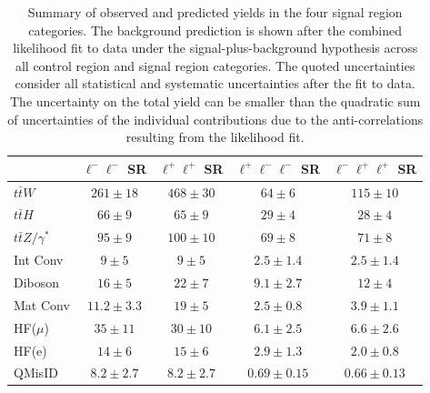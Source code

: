 \documentclass[cernpreprint, atlasdraft=false, texlive=2023, UKenglish, texmf, orcidlogo]{atlasdoc}
\begin{document}
\begin{table}[htbp]
\begin{center}
\caption{Summary of observed and predicted yields in the four signal region categories. The background prediction is shown after the combined likelihood fit to data under the signal-plus-background hypothesis across all control region and signal region categories. The quoted uncertainties consider all statistical and systematic uncertainties after the fit to data. The uncertainty on the total yield can be smaller than the quadratic sum of uncertainties of the individual contributions due to the anti-correlations resulting from the likelihood fit. \label{tab:SRspostfityields}}
\begin{tabular}{l|c|c|c|c}
\hline
& \textbf{$\ell^-\ell^-$ SR}    & \textbf{$\ell^+\ell^+$ SR}   & \textbf{$\ell^+\ell^-\ell^-$ SR}  & \textbf{$\ell^-\ell^+\ell^+$ SR} \\
\hline \hline
$t\bar{t}W$                     & $261\pm18$                   & $468\pm30$                     & $64\pm6$                            & $115\pm10$\\
$t\bar{t}H$                     & $66\pm9$                        & $65\pm9$                         & $29\pm4$                            & $28\pm4$  \\
$t\bar{t}Z/\gamma^*$     		& $95\pm9$                        & $100\pm10$                    & $69\pm8$                             & $71\pm8$  \\
Int Conv 						& \phantom{0}$9\pm5$       & \phantom{0}$9\pm5$      & \phantom{0}$2.5\pm1.4$      & \phantom{0}$2.5\pm1.4$   \\
Diboson                          & $16\pm5$                        & $22\pm7$                        & \phantom{0}$9.1\pm2.7$      & $12\pm4$  \\
Mat Conv                        & $11.2\pm3.3$                  & $19\pm5$                        & \phantom{0}$2.5\pm0.8$      & \phantom{0}$3.9\pm1.1$   \\
HF($\mu$)                      & \phantom{0}$35\pm11$   & \phantom{0}$30\pm10$   & \phantom{0}$6.1\pm2.5$     & \phantom{0}$6.6\pm2.6$   \\
HF(e)                              & $14\pm6$                        & $15\pm6$                        & \phantom{0}$2.9\pm1.3$      & \phantom{0}$2.0\pm0.8$   \\
QMisID                           & \phantom{0}$8.2\pm2.7$ & \phantom{0}$8.2\pm2.7$ & \phantom{0}$0.69\pm0.15$ & \phantom{0}$0.66\pm0.13$ \\

\end{tabular}
\end{center}
\end{table}
\end{document}
